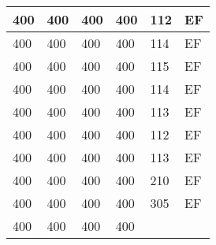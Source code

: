 \begin{table}[]
\begin{tabular}{lllll|l|}
400                                 & 400                                & 400                                & 400                                & 
112                                & EF                                    \\ \hline
400                                 & 400                                & 400                                & 400                                & 
114                                & EF                                    \\ \hline
400                                 & 400                                & 400                                & 400                                & 
115                                & EF                                    \\ \hline
400                                 & 400                                & 400                                & 400                                & 
114                                & EF                                    \\ \hline
400                                 & 400                                & 400                                & 400                                & 
113                                & EF                                    \\ \hline
400                                 & 400                                & 400                                & 400                                & 
112                                & EF                                    \\ \hline
400                                 & 400                                & 400                                & 400                                & 
113                                & EF                                    \\ \hline
400                                 & 400                                & 400                                & 400                                & 
210                                & EF                                    \\ \hline
400                                 & 400                                & 400                                & 400                                & 
305                                & EF                                    \\ \hline
400                                 & 400                                & 400                                & 400                                & 

\end{tabular}
\end{table}

